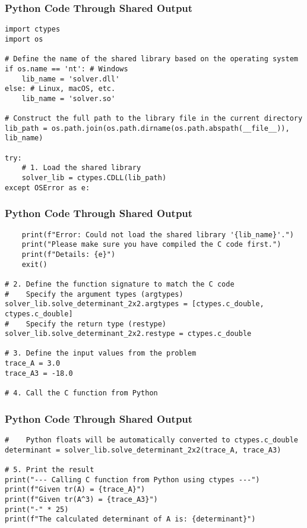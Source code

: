 \documentclass{beamer}
\begin{document}
    \begin{frame}[fragile]
    \frametitle{Python Code Through Shared Output}
    \begin{lstlisting}
import ctypes
import os

# Define the name of the shared library based on the operating system
if os.name == 'nt': # Windows
    lib_name = 'solver.dll'
else: # Linux, macOS, etc.
    lib_name = 'solver.so'

# Construct the full path to the library file in the current directory
lib_path = os.path.join(os.path.dirname(os.path.abspath(__file__)), lib_name)

try:
    # 1. Load the shared library
    solver_lib = ctypes.CDLL(lib_path)
except OSError as e:
    \end{lstlisting}
    \end{frame}
    \begin{frame}[fragile]
    \frametitle{Python Code Through Shared Output}
    \begin{lstlisting}
    print(f"Error: Could not load the shared library '{lib_name}'.")
    print("Please make sure you have compiled the C code first.")
    print(f"Details: {e}")
    exit()

# 2. Define the function signature to match the C code
#    Specify the argument types (argtypes)
solver_lib.solve_determinant_2x2.argtypes = [ctypes.c_double, ctypes.c_double]
#    Specify the return type (restype)
solver_lib.solve_determinant_2x2.restype = ctypes.c_double

# 3. Define the input values from the problem
trace_A = 3.0
trace_A3 = -18.0

# 4. Call the C function from Python
    \end{lstlisting}
    \end{frame}
    \begin{frame}[fragile]
    \frametitle{Python Code Through Shared Output}
    \begin{lstlisting}
#    Python floats will be automatically converted to ctypes.c_double
determinant = solver_lib.solve_determinant_2x2(trace_A, trace_A3)

# 5. Print the result
print("--- Calling C function from Python using ctypes ---")
print(f"Given tr(A) = {trace_A}")
print(f"Given tr(A^3) = {trace_A3}")
print("-" * 25)
print(f"The calculated determinant of A is: {determinant}")
    \end{lstlisting}
    \end{frame}
\end{document}
